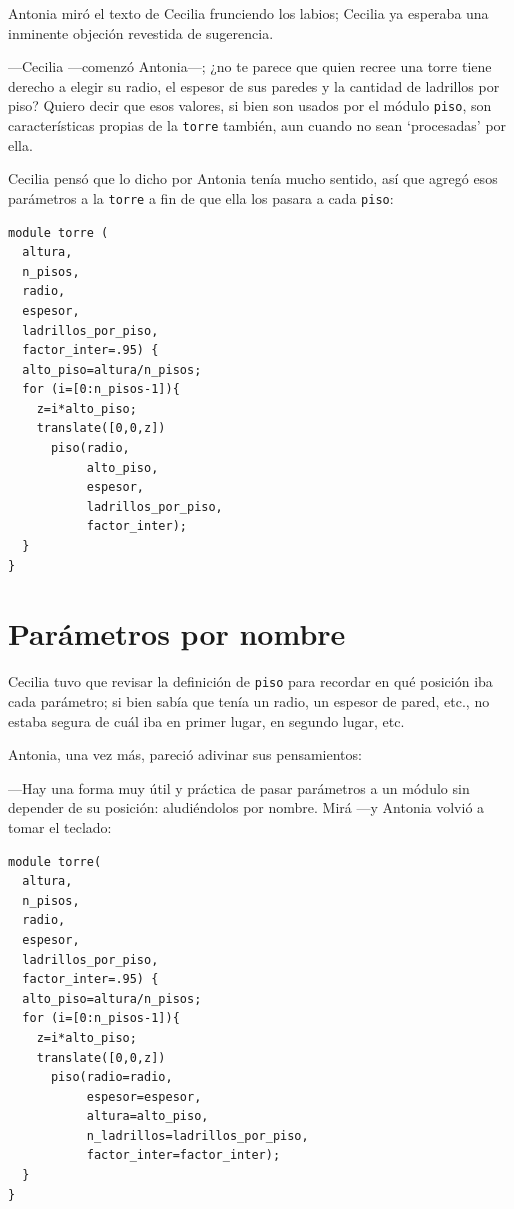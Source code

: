   Antonia miró el texto de Cecilia frunciendo los labios; Cecilia ya
  esperaba una inminente objeción revestida de
  sugerencia.

  ---Cecilia ---comenzó Antonia---; ¿no te parece que quien recree una
  torre tiene derecho a elegir su radio, el espesor de sus paredes y
  la cantidad de ladrillos por piso? Quiero decir que esos valores, si
  bien son usados por el módulo \texttt{piso}, son características
  propias de la \texttt{torre} también, aun cuando no sean
  `procesadas' por ella.

  Cecilia pensó que lo dicho por Antonia tenía mucho sentido, así que
  agregó esos parámetros a la \texttt{torre} a fin de que ella los
  pasara a cada \texttt{piso}:

    \begin{lstlisting}
module torre (
  altura,
  n_pisos,
  radio,
  espesor,
  ladrillos_por_piso,
  factor_inter=.95) {
  alto_piso=altura/n_pisos;
  for (i=[0:n_pisos-1]){
    z=i*alto_piso;
    translate([0,0,z])
      piso(radio,
           alto_piso,
           espesor,
           ladrillos_por_piso,
           factor_inter);
  }
}
    \end{lstlisting}


  \section{Parámetros por nombre}

  Cecilia tuvo que revisar la definición de \texttt{piso} para
  recordar en qué posición iba cada parámetro; si bien sabía que
  tenía un radio, un espesor de pared, etc., no estaba segura de cuál
  iba en primer lugar, en segundo lugar, etc.

  Antonia, una vez más, pareció adivinar sus pensamientos:

  ---Hay una forma muy útil y práctica de pasar parámetros a un módulo
  sin depender de su posición: aludiéndolos por nombre. Mirá ---y
  Antonia volvió a tomar el teclado:



    \begin{lstlisting}
module torre(
  altura,
  n_pisos,
  radio,
  espesor,
  ladrillos_por_piso,
  factor_inter=.95) {
  alto_piso=altura/n_pisos;
  for (i=[0:n_pisos-1]){
    z=i*alto_piso;
    translate([0,0,z])
      piso(radio=radio,
           espesor=espesor,
           altura=alto_piso,
           n_ladrillos=ladrillos_por_piso,
           factor_inter=factor_inter);
  }
}
    \end{lstlisting}

